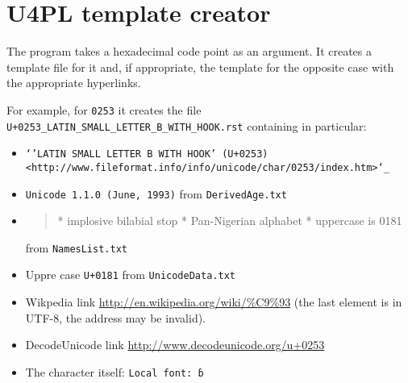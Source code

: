 \documentclass[12]{mwart}
\begin{document}
\section{U4PL template creator}
\label{sec:u4pl-templ-creat}

The program takes a hexadecimal code point as an argument. It creates
a template file for it and, if appropriate, the template for the
opposite case with the appropriate hyperlinks.

For example, for \texttt{0253} it creates the file
\texttt{U+0253_LATIN_SMALL_LETTER_B_WITH_HOOK.rst} containing in
particular:

\begin{itemize}
\item \texttt{`'LATIN SMALL LETTER B WITH HOOK' (U+0253) <http://www.fileformat.info/info/unicode/char/0253/index.htm>`_
}
\item \texttt{Unicode 1.1.0 (June, 1993)}
from \texttt{DerivedAge.txt}
\item 
  \begin{quote}
    \obeylines
    	* implosive bilabial stop
	* Pan-Nigerian alphabet
	* uppercase is 0181
  \end{quote}
from \texttt{NamesList.txt}
\item Uppre case \texttt{U+0181} from \texttt{UnicodeData.txt}
\item Wikpedia link \url{http://en.wikipedia.org/wiki/%C9%93} (the last element is in UTF-8, the address may be invalid).
\item DecodeUnicode link \url{http://www.decodeunicode.org/u+0253}
\item The character itself: \texttt{Local font: ɓ}


\end{itemize}
\end{document}
